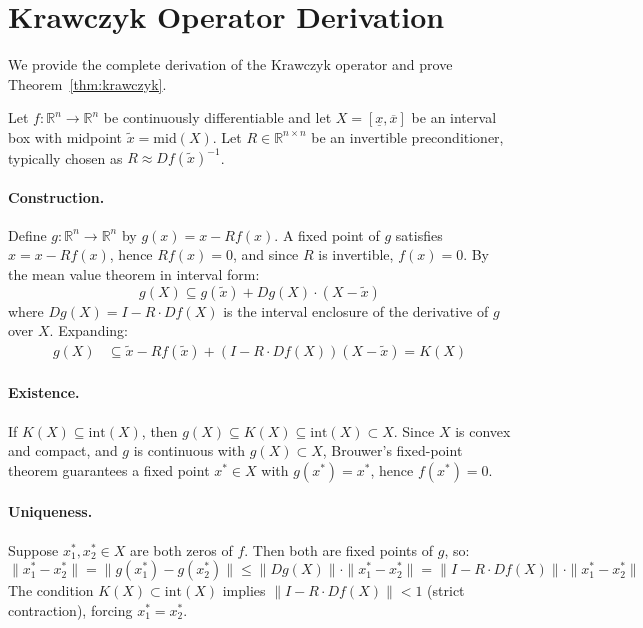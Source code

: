 \documentclass[11pt]{article}
\newcommand{\R}{\mathbb{R}}
\newcommand{\norm}[1]{\|#1\|}
\begin{document}
\appendix

\section{Krawczyk Operator Derivation}
\label{app:krawczyk}

We provide the complete derivation of the Krawczyk operator and prove Theorem~\ref{thm:krawczyk}.

Let $f: \R^n \to \R^n$ be continuously differentiable and let $X = [\underline{x}, \overline{x}]$ be an interval box with midpoint $\tilde{x} = \mathrm{mid}(X)$.
Let $R \in \R^{n \times n}$ be an invertible preconditioner, typically chosen as $R \approx Df(\tilde{x})^{-1}$.

\paragraph{Construction.}
Define $g: \R^n \to \R^n$ by $g(x) = x - Rf(x)$.
A fixed point of $g$ satisfies $x = x - Rf(x)$, hence $Rf(x) = 0$, and since $R$ is invertible, $f(x) = 0$.
By the mean value theorem in interval form:
\[
g(X) \subseteq g(\tilde{x}) + Dg(X) \cdot (X - \tilde{x})
\]
where $Dg(X) = I - R \cdot Df(X)$ is the interval enclosure of the derivative of $g$ over $X$.
Expanding:
\begin{align}
g(X) &\subseteq \tilde{x} - Rf(\tilde{x}) + (I - R \cdot Df(X))(X - \tilde{x}) = K(X)
\end{align}

\paragraph{Existence.}
If $K(X) \subseteq \mathrm{int}(X)$, then $g(X) \subseteq K(X) \subseteq \mathrm{int}(X) \subset X$.
Since $X$ is convex and compact, and $g$ is continuous with $g(X) \subset X$, Brouwer's fixed-point theorem guarantees a fixed point $x^* \in X$ with $g(x^*) = x^*$, hence $f(x^*) = 0$.

\paragraph{Uniqueness.}
Suppose $x_1^*, x_2^* \in X$ are both zeros of $f$.  Then both are fixed points of $g$, so:
\[
\norm{x_1^* - x_2^*} = \norm{g(x_1^*) - g(x_2^*)} \leq \norm{Dg(X)} \cdot \norm{x_1^* - x_2^*} = \norm{I - R \cdot Df(X)} \cdot \norm{x_1^* - x_2^*}
\]
The condition $K(X) \subset \mathrm{int}(X)$ implies $\norm{I - R \cdot Df(X)} < 1$ (strict contraction), forcing $x_1^* = x_2^*$.
\end{document}
